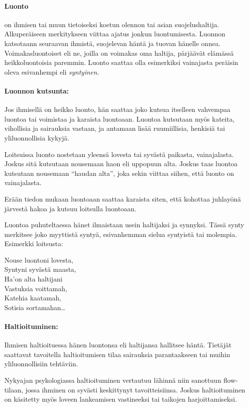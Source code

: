   \paragraph{Luonto} on ihmisen tai muun tietoiseksi koetun olennon tai asian suojelushaltija.
    Alkuperäiseen merkitykseen viittaa ajatus jonkun luontumisesta. Luonnon katsotaann
    seuraavan ihmistä, suojelevan häntä ja tuovan hänelle onnea. Voimakasluontoiset eli ne,
    joilla on voimakas oma haltija, pärjäävät elämässä heikkoluontoisia paremmin. Luonto
    saattaa olla esimerkiksi vainajasta peräisin oleva esivanhempi eli \emph{syntyinen}.
  \paragraph{Luonnon kutsunta:} Jos ihmisellä on heikko luonto, hän saattaa joko kutsua itselleen
    vahvempaa luontoa tai voimistaa ja karaista luontoaan. Luontoa kutsutaan myös kateita,
    vihollisia ja sairauksia vastaan, ja antamaan lisää ruumiillisia, henkisiä tai yliluonnollisia
    kykyjä.
    \par
    Loitsuissa luonto nostetaan yleensä lovesta tai syvästä paikasta, vainajalasta. Joskus sitä
    kutsutaan nousemaan haon eli uppopuun alta. Joskus taas luontoa kutsutaan nousemaan ``haudan
    alta'', joka sekin viittaa siihen, että luonto on vainajalasta.
    \par
    Erään tiedon mukaan luontoaan saattaa karaista siten, että kohottaa juhlayönä järvestä hakoa
    ja kutsuu loitsulla luontoaan.
    \par
    Luontoa puhuteltaessa hänet ilmaistaan usein haltijaksi ja synnyksi. Tässä synty merkitsee
    joko myyttistä syntyä, esivanhemman sielua syntyistä tai molempia. Esimerkki loitsusta:

    \begin{center}\begin{em}
      Nouse luontoni lovesta,\\
      Syntyni syvästä maasta,\\
      Ha'on alta haltijani\\
      Vastuksia voittamah,\\
      Katehia kaatamah,\\
      Sotisia sortamahan\ldots\\
    \end{em}\end{center}

  \paragraph{Haltioituminen:} Ihmisen haltioituessa hänen luontonsa eli haltijansa hallitsee
    häntä. Tietäjät saattavat tavoitella haltioitumisen tilaa sairauksia parantaakseen tai
    muihin yliluonnollisiin tehtäviin.
    \par
    Nykyajan psykologiassa haltioituminen vertautuu lähinnä niin sanottuun flow-tilaan, jossa
    ihminen on syvästi keskittynyt tavoitteisiinsa. Joskus haltioituminen on käsitetty myös
    loveen lankeamisen vastineeksi tai taikojen harjoittamiseksi.
